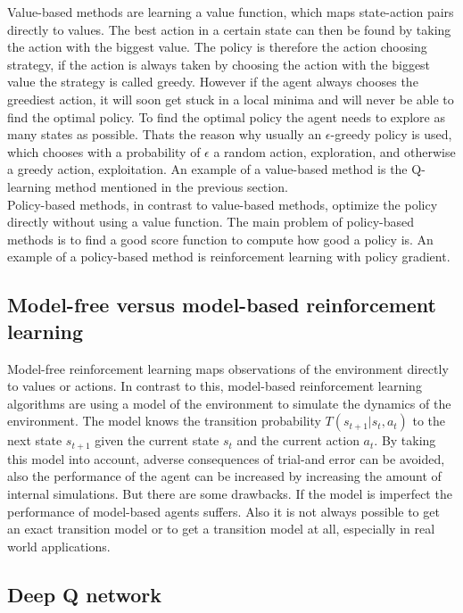 Value-based methods are learning a value function, which maps state-action pairs directly to values. The best action in a certain state can then be found by taking the action with the biggest value. 
The policy is therefore the action choosing strategy, if the action is always taken by choosing the action with the biggest value the strategy is called greedy.
However if the agent always chooses the greediest action, it will soon get stuck in a local minima and will never be able to find the optimal policy. 
To find the optimal policy the agent needs to explore as many states as possible. 
Thats the reason why usually an $\epsilon$-greedy policy is used, which chooses with a probability of $\epsilon$ a random action, exploration, and otherwise a greedy action, exploitation.
An example of a value-based method is the Q-learning method mentioned in the previous section.\\

Policy-based methods, in contrast to value-based methods, optimize the policy directly without using a value function.
The main problem of policy-based methods is to find a good score function to compute how good a policy is. An example of a policy-based method is reinforcement learning with policy gradient.\\


\subsection{Model-free versus model-based reinforcement learning}

Model-free reinforcement learning maps observations of the environment directly to values or actions.
In contrast to this, model-based reinforcement learning algorithms are using a model of the environment to simulate the dynamics of the environment. The model knows the transition probability $T(s_{t+1} | s_t, a_t)$ to the next state $s_{t+1}$ given the current state $s_t$ and the current action $a_t$. By taking this model into account, adverse consequences of trial-and error can be avoided, also the performance of the agent can be increased by increasing the amount of internal simulations.
But there are some drawbacks. If the model is imperfect the performance of model-based agents suffers. Also it is not always possible to get an exact transition model or to get a transition model at all, especially in real world applications.\\



\subsection{Deep Q network}

